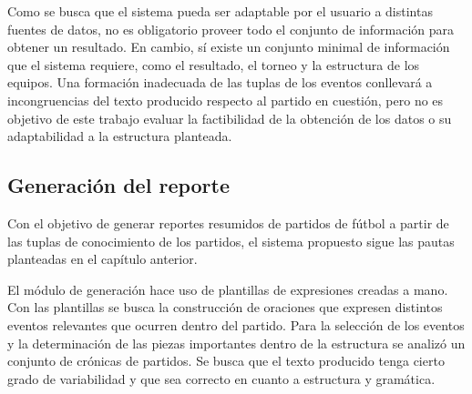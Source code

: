     Como se busca que el sistema pueda ser adaptable por el usuario a distintas fuentes de datos, no es obligatorio proveer todo el conjunto de información para 
obtener un resultado. En cambio, sí existe un conjunto minimal de información que el sistema requiere, como el resultado, el torneo y la estructura de los equipos. 
Una formación inadecuada de las tuplas de los eventos conllevará a incongruencias del texto producido respecto al partido en cuestión, pero no es objetivo de 
este trabajo evaluar la factibilidad de la obtención de los datos o su adaptabilidad a la estructura planteada.


\subsection{Generación del reporte}

    Con el objetivo de generar reportes resumidos de partidos de fútbol a partir de las tuplas de conocimiento de los partidos, el sistema propuesto sigue 
las pautas planteadas en el capítulo anterior.





    El módulo de generación hace uso de plantillas de expresiones creadas a mano. Con las plantillas se busca la 
construcción de oraciones que expresen distintos eventos relevantes que ocurren dentro del partido. Para la selección de 
los eventos y la determinación de las piezas importantes dentro de la estructura se analizó un conjunto de crónicas de partidos. 
Se busca que el texto producido tenga cierto grado de variabilidad y que sea correcto en cuanto a estructura y gramática.


